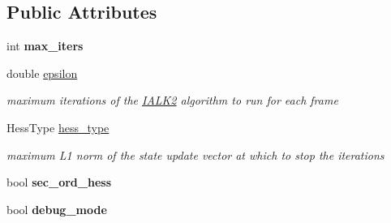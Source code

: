 \subsection*{Public Attributes}
\begin{DoxyCompactItemize}
\item 
\hypertarget{structIALK2Params_a233a0a1db5ab529f2a07f6f67160b2d4}{int {\bfseries max\-\_\-iters}}\label{structIALK2Params_a233a0a1db5ab529f2a07f6f67160b2d4}

\item 
\hypertarget{structIALK2Params_a58a3a704ad4c91ca93e451c4974ed481}{double \hyperlink{structIALK2Params_a58a3a704ad4c91ca93e451c4974ed481}{epsilon}}\label{structIALK2Params_a58a3a704ad4c91ca93e451c4974ed481}

\begin{DoxyCompactList}\small\item\em maximum iterations of the \hyperlink{classIALK2}{I\-A\-L\-K2} algorithm to run for each frame \end{DoxyCompactList}\item 
\hypertarget{structIALK2Params_a0b26ec58400a3188e7b220f64b9304b1}{Hess\-Type \hyperlink{structIALK2Params_a0b26ec58400a3188e7b220f64b9304b1}{hess\-\_\-type}}\label{structIALK2Params_a0b26ec58400a3188e7b220f64b9304b1}

\begin{DoxyCompactList}\small\item\em maximum L1 norm of the state update vector at which to stop the iterations \end{DoxyCompactList}\item 
\hypertarget{structIALK2Params_a399fce526b085fe80ee5c718e8b49123}{bool {\bfseries sec\-\_\-ord\-\_\-hess}}\label{structIALK2Params_a399fce526b085fe80ee5c718e8b49123}

\item 
\hypertarget{structIALK2Params_a2f8c3a4e1587a122a19ef6876d6cb1eb}{bool {\bfseries debug\-\_\-mode}}\label{structIALK2Params_a2f8c3a4e1587a122a19ef6876d6cb1eb}

\end{DoxyCompactItemize}


